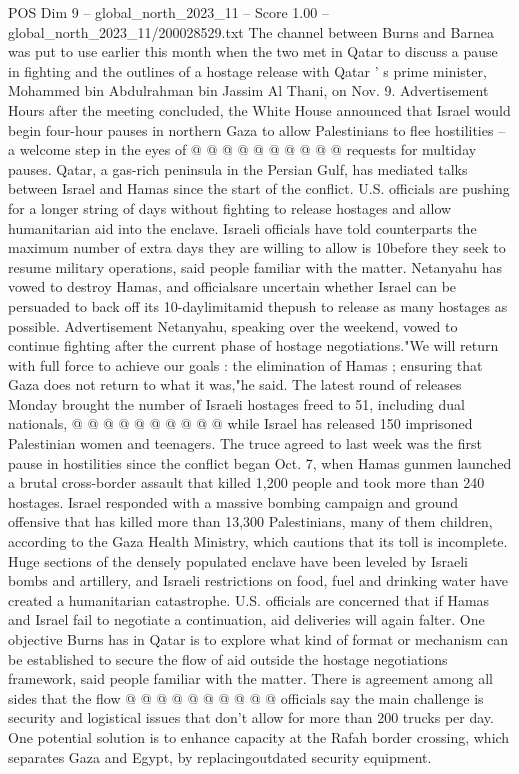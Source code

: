 \begin{textsample}{POS Dim 9 – global\_north\_2023\_11 – Score 1.00 – global\_north\_2023\_11/200028529.txt}
The channel between Burns and Barnea was put to use earlier this month when the two met in Qatar to discuss a pause in fighting and the outlines of a hostage release with Qatar ' s prime minister, Mohammed bin Abdulrahman bin Jassim Al Thani, on Nov. 9.
Advertisement Hours after the meeting concluded, the White House announced that Israel would begin four-hour pauses in northern Gaza to allow Palestinians to flee hostilities -- a welcome step in the eyes of @ @ @ @ @ @ @ @ @ @ requests for multiday pauses.
Qatar, a gas-rich peninsula in the Persian Gulf, has mediated talks between Israel and Hamas since the start of the conflict.
U.S. officials are pushing for a longer string of days without fighting to release hostages and allow humanitarian aid into the enclave.
Israeli officials have told counterparts the maximum number of extra days they are willing to allow is 10before they seek to resume military operations, said people familiar with the matter.
Netanyahu has vowed to destroy Hamas, and officialsare uncertain whether Israel can be persuaded to back off its 10-daylimitamid thepush to release as many hostages as possible.
Advertisement Netanyahu, speaking over the weekend, vowed to continue fighting after the current phase of hostage negotiations."We will return with full force to achieve our goals : the elimination of Hamas ; ensuring that Gaza does not return to what it was,"he said.
The latest round of releases Monday brought the number of Israeli hostages freed to 51, including dual nationals, @ @ @ @ @ @ @ @ @ @ while Israel has released 150 imprisoned Palestinian women and teenagers.
The truce agreed to last week was the first pause in hostilities since the conflict began Oct. 7, when Hamas gunmen launched a brutal cross-border assault that killed 1,200 people and took more than 240 hostages.
Israel responded with a massive bombing campaign and ground offensive that has killed more than 13,300 Palestinians, many of them children, according to the Gaza Health Ministry, which cautions that its toll is incomplete.
Huge sections of the densely populated enclave have been leveled by Israeli bombs and artillery, and Israeli restrictions on food, fuel and drinking water have created a humanitarian catastrophe.
U.S. officials are concerned that if Hamas and Israel fail to negotiate a continuation, aid deliveries will again falter.
One objective Burns has in Qatar is to explore what kind of format or mechanism can be established to secure the flow of aid outside the hostage negotiations framework, said people familiar with the matter.
There is agreement among all sides that the flow @ @ @ @ @ @ @ @ @ @ officials say the main challenge is security and logistical issues that don't allow for more than 200 trucks per day.
One potential solution is to enhance capacity at the Rafah border crossing, which separates Gaza and Egypt, by replacingoutdated security equipment.

\end{textsample}
